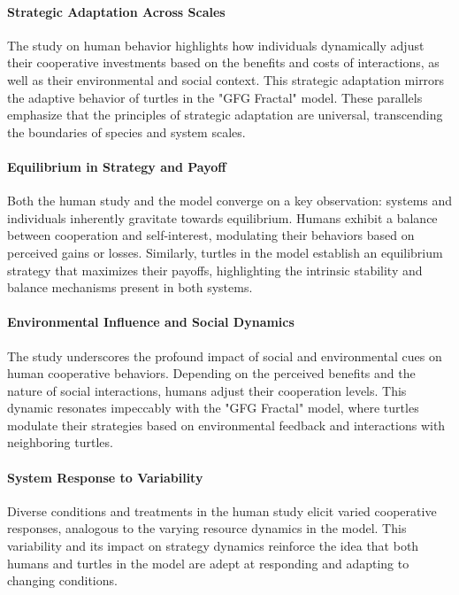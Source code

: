 \documentclass[sn-nature]{sn-jnl}%
\theoremstyle{thmstyleone}%
\theoremstyle{thmstyletwo}%
\theoremstyle{thmstylethree}%
\begin{document}
\paragraph{Strategic Adaptation Across Scales}
The study on human behavior highlights how individuals dynamically adjust their cooperative investments based on the benefits and costs of interactions, as well as their environmental and social context. This strategic adaptation mirrors the adaptive behavior of turtles in the "GFG Fractal" model. These parallels emphasize that the principles of strategic adaptation are universal, transcending the boundaries of species and system scales.

\paragraph{Equilibrium in Strategy and Payoff}
Both the human study and the model converge on a key observation: systems and individuals inherently gravitate towards equilibrium. Humans exhibit a balance between cooperation and self-interest, modulating their behaviors based on perceived gains or losses. Similarly, turtles in the model establish an equilibrium strategy that maximizes their payoffs, highlighting the intrinsic stability and balance mechanisms present in both systems.
\paragraph{
Environmental Influence and Social Dynamics}
The study underscores the profound impact of social and environmental cues on human cooperative behaviors. Depending on the perceived benefits and the nature of social interactions, humans adjust their cooperation levels. This dynamic resonates impeccably with the "GFG Fractal" model, where turtles modulate their strategies based on environmental feedback and interactions with neighboring turtles.

\paragraph{System Response to Variability}
Diverse conditions and treatments in the human study elicit varied cooperative responses, analogous to the varying resource dynamics in the model. This variability and its impact on strategy dynamics reinforce the idea that both humans and turtles in the model are adept at responding and adapting to changing conditions.
\end{document}
